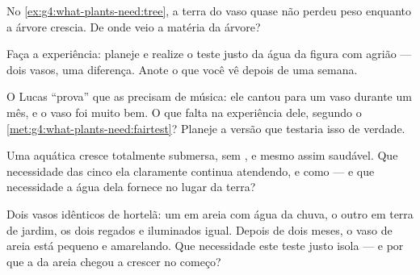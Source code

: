 \begin{exercise}[$\star$]\label{exo:g4:what-plants-need:7}
No \cref{ex:g4:what-plants-need:tree}, a terra do vaso quase não
perdeu peso enquanto a árvore crescia. De onde veio a matéria da
árvore?
\end{exercise}

\begin{exercise}[$\star$]\label{exo:g4:what-plants-need:8}
Faça a experiência: planeje e realize o teste justo da água da
figura com agrião --- dois vasos, uma diferença. Anote o que você vê
depois de uma semana.
\end{exercise}

\begin{exercise}[$\star\star$]\label{exo:g4:what-plants-need:9}
O Lucas ``prova'' que as  precisam de música: ele cantou para
um vaso durante um mês, e o vaso foi muito bem. O que falta na
experiência dele, segundo o \cref{met:g4:what-plants-need:fairtest}?
Planeje a versão que testaria isso de verdade.
\end{exercise}

\begin{exercise}[$\star\star$]\label{exo:g4:what-plants-need:10}
Uma  aquática cresce totalmente submersa, sem , e mesmo
assim saudável. Que necessidade das cinco ela claramente continua
atendendo, e como --- e que necessidade a água dela fornece no lugar
da terra?
\end{exercise}

\begin{exercise}[$\star\star\star$]\label{exo:g4:what-plants-need:11}
Dois vasos idênticos de hortelã: um em areia com água da chuva, o
outro em terra de jardim, os dois regados e iluminados igual.
Depois de dois meses, o vaso de areia está pequeno e amarelando. Que
necessidade este teste justo isola --- e por que a  da areia
chegou a crescer no começo?
\end{exercise}

